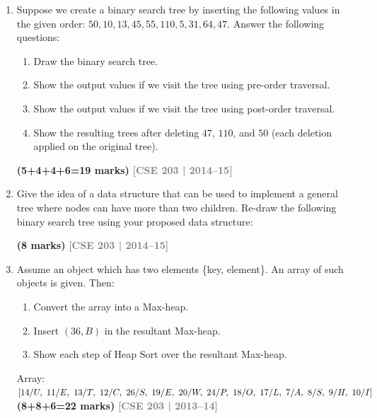 \documentclass[12pt,a3paper]{article}
\newcommand{\yr}[1]{\hfill\textcolor{gray}{\small\textbf{[#1]}}}
\newcommand{\mk}[1]{\textcolor{orange!70!black}{\small\textbf{(#1 marks)}}}
\begin{document}
\begin{enumerate}
\item Suppose we create a binary search tree by inserting the following values in the given order: $50, 10, 13, 45, 55, 110, 5, 31, 64, 47$. Answer the following questions:
\begin{enumerate}
  \item Draw the binary search tree.
  \item Show the output values if we visit the tree using pre-order traversal.
  \item Show the output values if we visit the tree using post-order traversal.
  \item Show the resulting trees after deleting $47$, $110$, and $50$ (each deletion applied on the original tree).
\end{enumerate}
\mk{5+4+4+6=19}
\yr{CSE 203 | 2014--15}


\item Give the idea of a data structure that can be used to implement a general tree where nodes can have more than two children. Re-draw the following binary search tree using your proposed data structure:
\begin{center}
\end{center}
\mk{8}
\yr{CSE 203 | 2014--15}

\item Assume an object which has two elements \{key, element\}. An array of such objects is given. Then:
\begin{enumerate}
  \item Convert the array into a Max-heap.
  \item Insert $(36, B)$ in the resultant Max-heap.
  \item Show each step of Heap Sort over the resultant Max-heap.
\end{enumerate}
Array: $[14/U,\ 11/E,\ 13/T,\ 12/C,\ 26/S,\ 19/E,\ 20/W,\ 24/P,\ 18/O,\ 17/L,\ 7/A,\ 8/S,\\\ 9/H,\ 10/I]$
\mk{8+8+6=22}
\yr{CSE 203 | 2013--14}


\end{enumerate}
\end{document}
